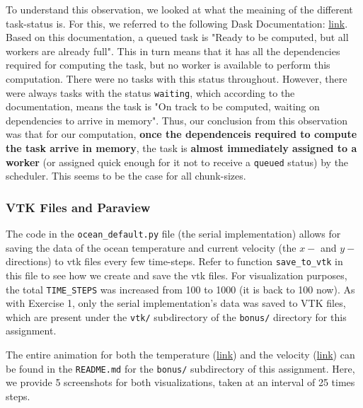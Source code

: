 \documentclass[a4paper,12pt]{article}
\begin{document}
\begin{itemize}
To understand this observation, we looked at what the meaining of the different task-status is. For this, we referred to the following Dask Documentation: \href{https://distributed.dask.org/en/stable/scheduling-state.html#task-state}{link}. Based on this documentation, a queued task is "Ready to be computed, but all workers are already full". This in turn means that it has all the dependencies required for computing the task, but no worker is available to perform this computation. There were no tasks with this status throughout. However, there were always tasks with the status \verb|waiting|, which according to the documentation, means the task is "On track to be computed, waiting on dependencies to arrive in memory". Thus, our conclusion from this observation was that for our computation, \textbf{once the dependenceis required to compute the task arrive in memory}, the task is \textbf{almost immediately assigned to a worker} (or assigned quick enough for it not to receive a \verb|queued| status) by the scheduler. This seems to be the case for all chunk-sizes.

\end{itemize}

\subsubsection{VTK Files and Paraview}
The code in the \verb|ocean_default.py| file (the serial implementation) allows for saving the data of the ocean temperature and current velocity (the $x-$ and $y-$ directions) to vtk files every few time-steps. Refer to function \verb|save_to_vtk| in this file to see how we create and save the vtk files. For visualization purposes, the total \verb|TIME_STEPS| was increased from 100 to 1000 (it is back to 100 now). As with Exercise 1, only the serial implementation's data was saved to VTK files, which are present under the \verb|vtk/| subdirectory of the \verb|bonus/| directory for this assignment.

The entire animation for both the temperature (\href{https://github.com/paulmyr/DD2358-HPC25/blob/master/04_parallel/bonus/README.md#temperature-visualization}{link}) and the velocity (\href{https://github.com/paulmyr/DD2358-HPC25/blob/master/04_parallel/bonus/README.md#velocity-visualization}{link}) can be found in the \verb|README.md| for the \verb|bonus/| subdirectory of this assignment. Here, we provide 5 screenshots for both visualizations, taken at an interval of 25 times steps.
\end{document}
